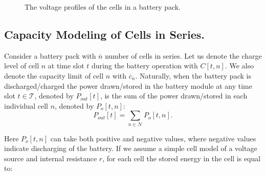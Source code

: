 \documentclass[10pt,twocolumn]{IEEEtran}
\begin{document}
\begin{figure}[t]
\centering
\vspace{-0.2cm}
{} \vspace{-0.1cm}
\caption{The voltage profiles of the cells in a battery pack.}
\vspace{-0.3cm}
\label{fig:packoperation}
\end{figure}

\subsection{Capacity Modeling of Cells  in Series.}
Consider a battery pack with $\overline{n}$  number of cells in series. 
Let us denote the charge level of cell $n$ at time slot $t$  during the battery operation with $C[t,n]$.
We also denote the capacity limit of cell $n$ with $\overline{c}_n$.
Naturally, when the battery pack is discharged/charged  the power drawn/stored in the battery module at any time slot $t \in \mathcal{T}$, denoted by $P_{out}[t]$,  is the sum of the power drawn/stored in each individual cell $n$, denoted by $P_{o}[t,n]$:
\begin{equation}
P_{out}[t]=\sum_{n \in \mathcal{N}}  P_{o}[t,n].%
\label{Pmodule}
\end{equation}

\noindent Here $P_{o}[t,n]$ can take both positive and negative values, where negative values indicate discharging of the battery.
If we assume a simple cell model of a voltage source and internal resistance $r$, for each cell the stored energy in the cell is equal to:
\end{document}
